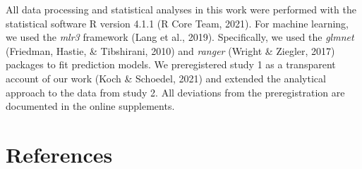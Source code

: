 \documentclass[
  english,
  man,floatsintext]{apa6}
\begin{document}
All data processing and statistical analyses in this work were performed with the statistical software R version 4.1.1 (R Core Team, 2021). For machine learning, we used the \emph{mlr3} framework (Lang et al., 2019). Specifically, we used the \emph{glmnet} (Friedman, Hastie, \& Tibshirani, 2010) and \emph{ranger} (Wright \& Ziegler, 2017) packages to fit prediction models. We preregistered study 1 as a transparent account of our work (Koch \& Schoedel, 2021) and extended the analytical approach to the data from study 2. All deviations from the preregistration are documented in the online supplements.

\newpage

\hypertarget{references}{%
\section{References}\label{references}}
\end{document}

